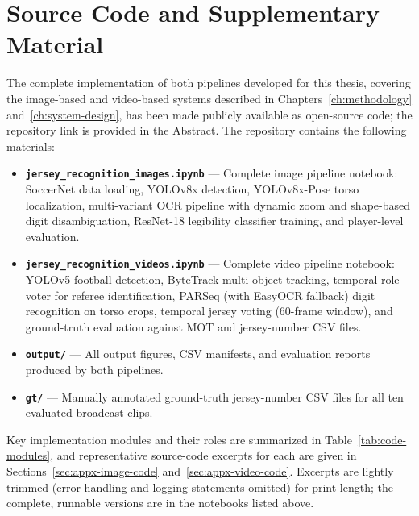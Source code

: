 \chapter{Source Code and Supplementary Material}
\label{ch:appendix}

The complete implementation of both pipelines developed for this
thesis, covering the image-based and video-based systems described in
Chapters~\ref{ch:methodology} and~\ref{ch:system-design}, has been made
publicly available as open-source code; the repository link is provided
in the Abstract. The repository contains the following materials:

\begin{itemize}[noitemsep]
    \item \textbf{\texttt{jersey\_recognition\_images.ipynb}} --- Complete
    image pipeline notebook: SoccerNet data loading, YOLOv8x detection,
    YOLOv8x-Pose torso localization, multi-variant OCR pipeline with
    dynamic zoom and shape-based digit disambiguation, ResNet-18
    legibility classifier training, and player-level evaluation.

    \item \textbf{\texttt{jersey\_recognition\_videos.ipynb}} --- Complete
    video pipeline notebook: YOLOv5 football detection, ByteTrack
    multi-object tracking, temporal role voter for referee
    identification, PARSeq (with EasyOCR fallback) digit recognition on
    torso crops, temporal jersey voting (60-frame window), and
    ground-truth evaluation against MOT and jersey-number CSV files.

    \item \textbf{\texttt{output/}} --- All output figures, CSV manifests,
    and evaluation reports produced by both pipelines.

    \item \textbf{\texttt{gt/}} --- Manually annotated ground-truth
    jersey-number CSV files for all ten evaluated broadcast clips.
\end{itemize}

Key implementation modules and their roles are summarized in
Table~\ref{tab:code-modules}, and representative source-code excerpts
for each are given in Sections~\ref{sec:appx-image-code}
and~\ref{sec:appx-video-code}. Excerpts are lightly trimmed (error
handling and logging statements omitted) for print length; the complete,
runnable versions are in the notebooks listed above.

